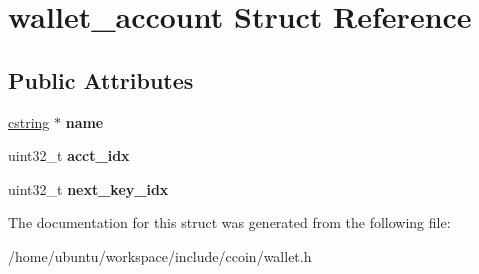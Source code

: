 \hypertarget{structwallet__account}{\section{wallet\-\_\-account Struct Reference}
\label{structwallet__account}
}
\subsection*{Public Attributes}
\begin{DoxyCompactItemize}
\item 
\hypertarget{structwallet__account_aa37912638e463c0ab8e540d915e2212b}{\hyperlink{structcstring}{cstring} $\ast$ {\bfseries name}}\label{structwallet__account_aa37912638e463c0ab8e540d915e2212b}

\item 
\hypertarget{structwallet__account_acd5a5908875e827e8d8e812b6cc9b530}{uint32\-\_\-t {\bfseries acct\-\_\-idx}}\label{structwallet__account_acd5a5908875e827e8d8e812b6cc9b530}

\item 
\hypertarget{structwallet__account_a2bf1dca4a9cbf3dafb4022b2e3eba6ac}{uint32\-\_\-t {\bfseries next\-\_\-key\-\_\-idx}}\label{structwallet__account_a2bf1dca4a9cbf3dafb4022b2e3eba6ac}

\end{DoxyCompactItemize}


The documentation for this struct was generated from the following file\-:\begin{DoxyCompactItemize}
\item 
/home/ubuntu/workspace/include/ccoin/wallet.\-h\end{DoxyCompactItemize}
